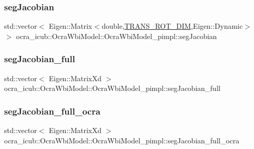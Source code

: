 \hypertarget{structOcraWbiModel_1_1OcraWbiModel__pimpl_a3430097cc1a200a4ff5abcafd52a7d44}{}\label{structOcraWbiModel_1_1OcraWbiModel__pimpl_a3430097cc1a200a4ff5abcafd52a7d44} 
\subsubsection{\texorpdfstring{seg\+Jacobian}{segJacobian}}
{\footnotesize\ttfamily std\+::vector$<$ Eigen\+::\+Matrix$<$double,\hyperlink{OcraWbiModel_8cpp_ab4a87cb824ceff256c6b8bce7701af58}{T\+R\+A\+N\+S\+\_\+\+R\+O\+T\+\_\+\+D\+IM},Eigen\+::\+Dynamic$>$ $>$ ocra\+\_\+icub\+::\+Ocra\+Wbi\+Model\+::\+Ocra\+Wbi\+Model\+\_\+pimpl\+::seg\+Jacobian}

\hypertarget{structOcraWbiModel_1_1OcraWbiModel__pimpl_abdfc807c93bad49781c9ad0f1588b203}{}\label{structOcraWbiModel_1_1OcraWbiModel__pimpl_abdfc807c93bad49781c9ad0f1588b203} 
\subsubsection{\texorpdfstring{seg\+Jacobian\+\_\+full}{segJacobian\_full}}
{\footnotesize\ttfamily std\+::vector$<$ Eigen\+::\+Matrix\+Xd $>$ ocra\+\_\+icub\+::\+Ocra\+Wbi\+Model\+::\+Ocra\+Wbi\+Model\+\_\+pimpl\+::seg\+Jacobian\+\_\+full}

\hypertarget{structOcraWbiModel_1_1OcraWbiModel__pimpl_ad4acb4942706d77c1dfd480132592ded}{}\label{structOcraWbiModel_1_1OcraWbiModel__pimpl_ad4acb4942706d77c1dfd480132592ded} 
\subsubsection{\texorpdfstring{seg\+Jacobian\+\_\+full\+\_\+ocra}{segJacobian\_full\_ocra}}
{\footnotesize\ttfamily std\+::vector$<$ Eigen\+::\+Matrix\+Xd $>$ ocra\+\_\+icub\+::\+Ocra\+Wbi\+Model\+::\+Ocra\+Wbi\+Model\+\_\+pimpl\+::seg\+Jacobian\+\_\+full\+\_\+ocra}

